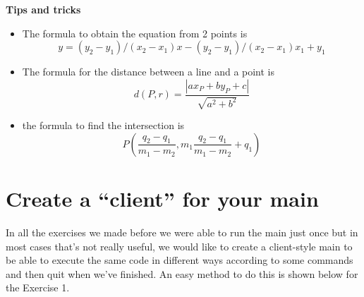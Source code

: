 \documentclass[11pt]{article}
\begin{document}
    \textbf{Tips and tricks}

\begin{itemize}
\item
  The formula to obtain the equation from 2 points is
  \[ y=(y_2-y_1)/(x_2-x_1)x-(y_2-y_1)/(x_2-x_1)x_1+y_1\]
\item
  The formula for the distance between a line and a point is
  \[d(P,r)=\frac{|ax_P+by_P+c|}{\sqrt{a^2+b^2}}\]
\item
  the formula to find the intersection is
  \[P\left({\frac {q_2-q_1}{m_1-m_2}},m_1{\frac {q_2-q_1}{m_1-m_2}}+q_1\right)\]
\end{itemize}

    \hypertarget{create-a-client-for-your-main}{%
\section{Create a ``client'' for your
main}\label{create-a-client-for-your-main}}

In all the exercises we made before we were able to run the main just
once but in most cases that's not really useful, we would like to create
a client-style main to be able to execute the same code in different
ways according to some commands and then quit when we've finished. An
easy method to do this is shown below for the Exercise 1.
\end{document}
